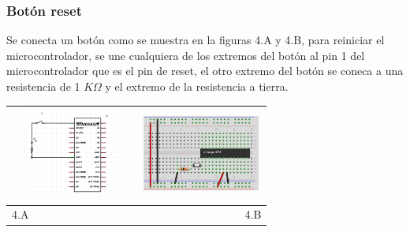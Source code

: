 \documentclass[12]{article}
\newenvironment{Figure}
{\par\medskip\noindent\minipage{\linewidth}}
{\endminipage\par\medskip}
\begin{document}
\begin{multicols}{2}
\subsubsection{Botón reset}
Se conecta un  botón como se muestra en la figuras 4.A y 4.B, para reiniciar el  microcontrolador, se une cualquiera de los  extremos del botón al pin 1 del microcontrolador que es el pin de reset, el otro extremo del botón se coneca  a una resistencia de 1 $K\Omega $ y el extremo de la resistencia a tierra.\\
\begin{Figure}
\center
\begin{tabular}{|l|r|}
\hline
\includegraphics[width=4cm, height=3cm]{img/botonesq.png} & \includegraphics[width=4cm, height=3cm]{img/botonpro.png} \\ \hline
4.A & 4.B \\ \hline
\end{tabular}
\label{fig:g4}
\end{Figure}

\end{multicols}
\end{document}
